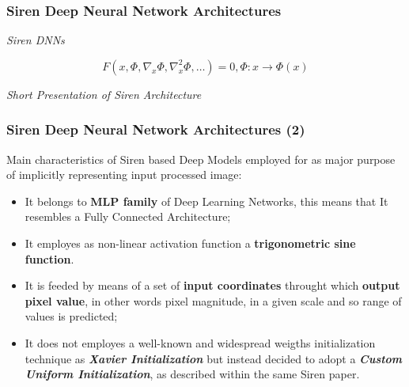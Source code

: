 
\begin{frame}
    \frametitle{Siren Deep Neural Network Architectures}
        \begin{center}
            {\fontsize{40}{50}\selectfont \emph{Siren DNNs}}
        \end{center}
        \begin{equation*}
            F(x, \Phi, \nabla_{x}\Phi, \nabla_{x}^{2}\Phi, \dots) = 0, \Phi:x\rightarrow\Phi(x)
        \end{equation*}
        \begin{center}
            \emph{Short Presentation of Siren Architecture}
        \end{center}
    \end{frame}


\begin{frame}
    \frametitle{Siren Deep Neural Network Architectures (2)}
        Main characteristics of Siren based Deep Models employed for as major purpose of implicitly representing input processed image:
        \begin{itemize}
        \item It belongs to \textbf{MLP family} of Deep Learning Networks, this means that It resembles a Fully Connected Architecture;
        \item It employes as non-linear activation function a \textbf{trigonometric sine function}.
        \item It is feeded by means of a set of \textbf{input coordinates} throught which \textbf{output pixel value}, in other words pixel magnitude, in a given scale and so range of values is predicted;
        \item It does not employes a well-known and widespread weigths initialization technique as \textbf{\emph{Xavier Initialization}} but instead decided to adopt a \textbf{\emph{Custom Uniform Initialization}}, as described within the same Siren paper.
        \end{itemize}
    \end{frame}
